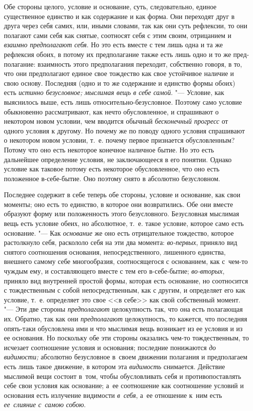 Обе стороны целого, условие и основание, суть, следовательно, единое
существенное единство и как содержание и как форма. Они переходят друг в
друга через себя самих, или, иными словами, так как они суть рефлексии, то
они полагают сами себя как снятые, соотносят себя с этим своим, отрицанием
и {\em взаимно предполагают себя}. Но это есть вместе с
тем лишь одна и та же рефлексия обоих, в потому их предполагание также есть
лишь одно и то же пред- полагание: взаимность этого предполагания
переходит, собственно говоря, в то, что они предполагают единое свое
тождество как свое устойчивое наличие и свою основу. Последняя (одно и то
же содержание и единство формы обоих) есть {\em истинно
безусловное; мыслимая вещь в себе самой}. "--- Условие, как выяснилось выше,
есть лишь относительно-безусловное. Поэтому само условие обыкновенно
рассматривают, как нечто обусловленное, и спрашивают о некотором новом
условии, чем вводится обычный {\em бесконечный
прогресс} от одного условия к другому. Но почему же по поводу одного
условия спрашивают о некотором новом условии, т.~е. почему первое
признается обусловленным? Потому что оно есть некоторое конечное наличное
бытие. Но это есть дальнейшее определение условия, не заключающееся в его
понятии. Однако условие как таковое потому есть некоторое обусловленное,
что оно есть положенное в-себе-бытие. Оно поэтому снято в абсолютно
безусловном.

Последнее содержит в себе теперь обе стороны, условие и основание, как свои
моменты; оно есть то единство, в которое они возвратились. Обе они вместе
образуют форму или положенность этого безусловного. Безусловная мыслимая вещь
есть условие обеих, но абсолютное, т.~е. такое условие, которое само есть
основание. "--- Как {\em основание} же оно есть отрицательное тождество,
которое растолкнуло себя, раскололо себя на эти два момента: {\em во-первых},
приняло вид снятого соотношения основания, непосредственного, лишенного
единства, внешнего самому себе многообразия, соотносящегося с основанием, как
с~чем-то чуждым ему, и составляющего вместе с тем его в-себе-бытие;
{\em во-вторых}, приняло вид внутренней простой формы, которая есть основание,
но соотносится с тождественным с собой непосредственным, как с другим, и
определяет его как условие, т.~е. определяет это свое <<в себе>> как свой
собственный момент. "--- Эти две стороны {\em предполагают} целокупность так,
что она есть полагающая их. Обратно, так как они {\em предполагают}
целокупность, то кажется, что последняя опять-таки обусловлена ими и что
мыслимая вещь возникает из ее условия и из ее основания. Но поскольку обе эти
стороны оказались чем-то тождественным, то исчезает соотношение условия и
основания; последние понижаются {\em до видимости;} абсолютно безусловное
в~своем движении полагания и предполагаем есть лишь такое движение, в котором
эта {\em видимость} снимается. Действие мыслимой вещи состоит в~том, чтобы
обусловливать себя и противопоставлять себе свои условия как основание; а~ее
соотношение как соотношение условий и основания есть излучение видимости
{\em в~себя}, а~ее отношение к~ним есть {\em ее~слияние с~самою собою}.

